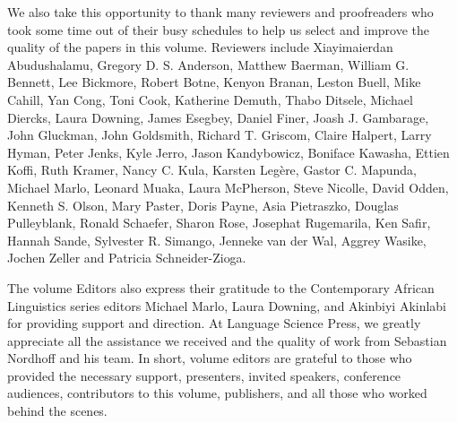 \begin{refsection}
\begin{sloppypar}
We also take this opportunity to thank many reviewers and proofreaders who took some time out of their busy schedules to help us select and improve the quality of the papers in this volume. Reviewers include Xiayimaierdan Abudushalamu, Gregory D. S. Anderson, Matthew Baerman, William G. Bennett, Lee Bickmore, Robert Botne, Kenyon Branan, Leston Buell, Mike Cahill, Yan Cong, Toni Cook, Katherine Demuth, Thabo Ditsele, Michael Diercks, Laura Downing, James Esegbey, Daniel Finer, Joash J. Gambarage, John Gluckman, John Goldsmith, Richard T. Griscom, Claire Halpert, Larry Hyman, Peter Jenks, Kyle Jerro, Jason Kandybowicz, Boniface Kawasha, Ettien Koffi, Ruth Kramer, Nancy C. Kula, Karsten Legère, Gastor C. Mapunda, Michael Marlo, Leonard Muaka, Laura McPherson, Steve Nicolle, David Odden, Kenneth S. Olson, Mary Paster, Doris Payne, Asia Pietraszko, Douglas Pulleyblank, Ronald Schaefer, Sharon Rose, Josephat Rugemarila, Ken Safir, Hannah Sande, Sylvester R. Simango, Jenneke van der Wal, Aggrey Wasike, Jochen Zeller and Patricia Schneider-Zioga.
\end{sloppypar}

The volume Editors also express their gratitude to the Contemporary African Linguistics series editors Michael Marlo, Laura Downing, and Akinbiyi Akinlabi for providing support and direction. At Language Science Press, we greatly appreciate all the assistance we received and the quality of work from Sebastian Nordhoff and his team. In short, volume editors are grateful to those who provided the necessary support, presenters, invited speakers, conference audiences, contributors to this volume, publishers, and all those who worked behind the scenes.

\end{refsection}

